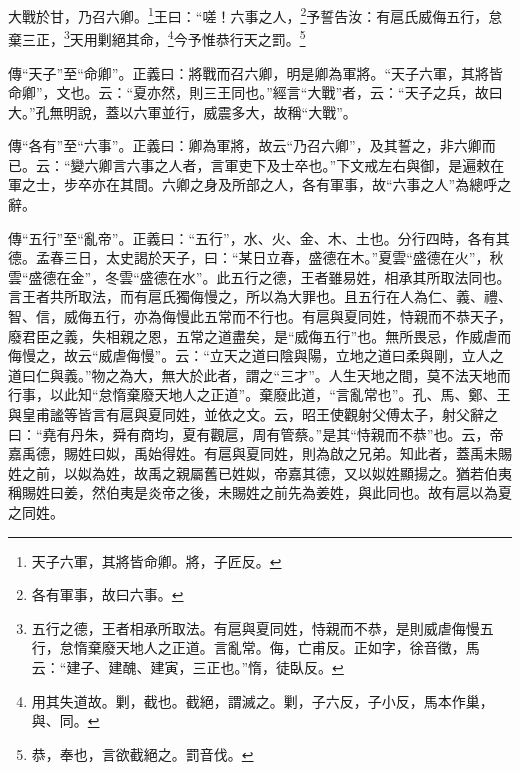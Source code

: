 大戰於甘，乃召六卿。\footnote{天子六軍，其將皆命卿。將，子匠反。}王曰：“嗟！六事之人，\footnote{各有軍事，故曰六事。}予誓告汝：有扈氏威侮五行，怠棄三正，\footnote{五行之德，王者相承所取法。有扈與夏同姓，恃親而不恭，是則威虐侮慢五行，怠惰棄廢天地人之正道。言亂常。侮，亡甫反。正如字，徐音徵，馬云：“建子、建醜、建寅，三正也。”惰，徒臥反。}天用剿絕其命，\footnote{用其失道故。剿，截也。截絕，謂滅之。剿，子六反，子小反，馬本作巢，與、同。}今予惟恭行天之罰。\footnote{恭，奉也，言欲截絕之。罰音伐。}


{\noindent\zhuan{}\fzbyks 傳“天子”至“命卿”。正義曰：將戰而召六卿，明是卿為軍將。“天子六軍，其將皆命卿”，文也。云：“夏亦然，則三王同也。”經言“大戰”者，云：“天子之兵，故曰大。”孔無明說，蓋以六軍並行，威震多大，故稱“大戰”。 \par}

{\noindent\zhuan{}\fzbyks 傳“各有”至“六事”。正義曰：卿為軍將，故云“乃召六卿”，及其誓之，非六卿而已。云：“變六卿言六事之人者，言軍吏下及士卒也。”下文戒左右與御，是遍敕在軍之士，步卒亦在其間。六卿之身及所部之人，各有軍事，故“六事之人”為總呼之辭。 \par}

{\noindent\zhuan{}\fzbyks 傳“五行”至“亂帝”。正義曰：“五行”，水、火、金、木、土也。分行四時，各有其德。孟春三日，太史謁於天子，曰：“某日立春，盛德在木。”夏雲“盛德在火”，秋雲“盛德在金”，冬雲“盛德在水”。此五行之德，王者雖易姓，相承其所取法同也。言王者共所取法，而有扈氏獨侮慢之，所以為大罪也。且五行在人為仁、義、禮、智、信，威侮五行，亦為侮慢此五常而不行也。有扈與夏同姓，恃親而不恭天子，廢君臣之義，失相親之恩，五常之道盡矣，是“威侮五行”也。無所畏忌，作威虐而侮慢之，故云“威虐侮慢”。云：“立天之道曰陰與陽，立地之道曰柔與剛，立人之道曰仁與義。”物之為大，無大於此者，謂之“三才”。人生天地之間，莫不法天地而行事，以此知“怠惰棄廢天地人之正道”。棄廢此道，“言亂常也”。孔、馬、鄭、王與皇甫謐等皆言有扈與夏同姓，並依之文。云，昭王使觀射父傅太子，射父辭之曰：“堯有丹朱，舜有商均，夏有觀扈，周有管蔡。”是其“恃親而不恭”也。云，帝嘉禹德，賜姓曰姒，禹始得姓。有扈與夏同姓，則為啟之兄弟。知此者，蓋禹未賜姓之前，以姒為姓，故禹之親屬舊已姓姒，帝嘉其德，又以姒姓顯揚之。猶若伯夷稱賜姓曰姜，然伯夷是炎帝之後，未賜姓之前先為姜姓，與此同也。故有扈以為夏之同姓。 \par}

